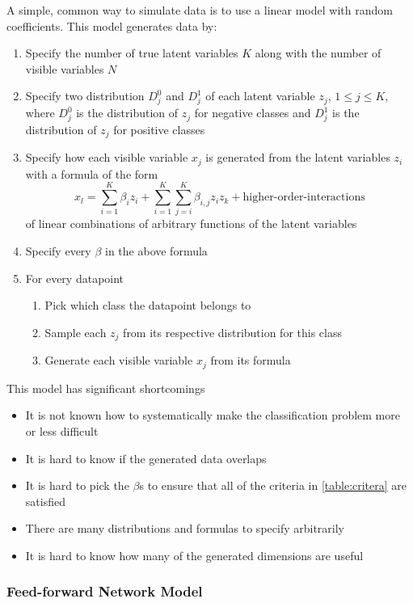 \documentclass{article}
\begin{document}
A simple, common way to simulate data is to use a linear model with random
coefficients. This model generates data by:
\begin{enumerate}
    \item Specify the number of true latent variables $K$ along with the number
        of visible variables $N$
    \item Specify two distribution $D_j^0$ and $D_j^1$ of each latent variable
        $z_j$, $1 \leq j \leq K$, where $D_j^0$ is the distribution of $z_j$
        for negative classes and $D_j^1$ is the distribution of $z_j$ for
        positive classes
    \item Specify how each visible variable $x_j$ is generated from the latent
        variables $z_i$ with a formula of the form
        $$
        x_l
        = \sum_{i=1}^K \beta_i z_i
        + \sum_{i=1}^K\sum_{j=i}^K \beta_{i,j} z_i z_k
        + \text{higher-order-interactions}
        $$
        of linear combinations of arbitrary functions of the latent variables
    \item Specify every $\beta$ in the above formula
    \item For every datapoint
    \begin{enumerate}
        \item Pick which class the datapoint belongs to
        \item Sample each $z_j$ from its respective distribution for this class
        \item Generate each visible variable $x_j$ from its formula
    \end{enumerate}
\end{enumerate}

This model has significant shortcomings
\begin{itemize}
    \item It is not known how to systematically make the classification problem
        more or less difficult
    \item It is hard to know if the generated data overlaps
    \item It is hard to pick the $\beta$s to ensure that all of the criteria in
        \ref{table:critera} are satisfied
    \item There are many distributions and formulas to specify arbitrarily
    \item It is hard to know how many of the generated dimensions are useful
\end{itemize}


\subsubsection*{Feed-forward Network Model}
\end{document}
